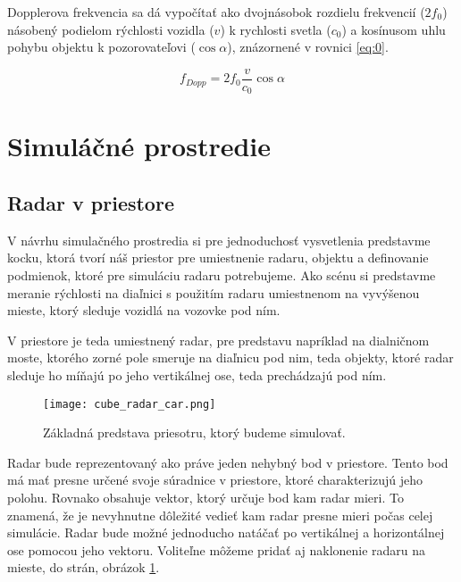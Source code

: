 \documentclass[slovak]{ExcelAtFIT} %
\begin{document}
    Dopplerova frekvencia sa dá vypočítať ako dvojná\-sobok rozdielu frekvencií ($2 f_{0}$) násobený podielom rýchlosti vozidla ($v$) k rychlosti svetla ($c_{0}$) a kosínusom uhlu pohybu objektu k pozorovateľovi ($\cos \alpha$), znázor\-nené v rovnici \ref{eq:0}.

      \begin{equation} \label{eq:0}
        f_{Dopp} = 2 f_{0} \frac{v}{c_{0}}\cos \alpha
      \end{equation}                

\section{Simuláčné prostredie}

  \subsection{Radar v priestore}

    \hspace{0.6cm}V návrhu simulačného prostredia si pre jednoduchosť vysvetlenia predstavme kocku, ktorá tvorí náš priestor pre umiestnenie radaru, objektu a definovanie podmienok, ktoré pre simuláciu radaru potrebujeme. Ako scénu si predstavme meranie rýchlosti na diaľnici s použitím radaru umiestnenom na vyvýšenou mieste, ktorý sleduje vozidlá na vozovke pod ním.

    V priestore je teda umiestnený radar, pre predstavu napríklad na dialničnom moste, ktorého zorné pole smeruje na diaľnicu pod nim, teda objekty, ktoré radar sleduje ho míňajú po jeho vertikálnej ose, teda prechádzajú pod ním.

	\begin{figure}[t]
		\centering
		\texttt{[image: cube\_radar\_car.png]}
		\caption{Základná predstava priesotru, ktorý budeme simulovať.}
		\label{fig:cube_radar_car}
	\end{figure}

    Radar bude reprezentovaný ako práve jeden nehybný bod v priestore. Tento bod má mať presne určené svoje súradnice v priestore, ktoré charakterizujú jeho polohu. Rovnako obsahuje vektor, ktorý určuje bod kam radar mieri. To znamená, že je nevyhnutne dôležité vedieť kam radar presne mieri počas celej simulácie. Radar bude možné jednoducho natáčať po vertikálnej a horizontálnej ose pomocou jeho vektoru. Voliteľne môžeme pridať aj naklonenie radaru na mieste, do strán, obrázok \ref{fig:cube_radar_car}.
    
\end{document}
